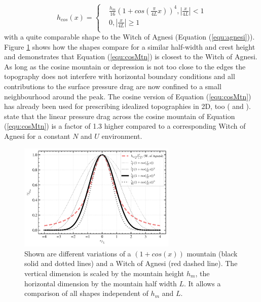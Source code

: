 \begin{equation}
    h_{cos}(x) = 
    \begin{cases}
        & \frac{h_m}{16} (1+cos(\frac{\pi}{4L}x))^4, |\frac{x}{4L}| < 1 \\
        & 0, |\frac{x}{4L}| \geq 1 \\
      \end{cases}
    \label{equ:cosMtn}
\end{equation}
with a quite comparable shape to the Witch of Agnesi (Equation (\ref{equ:agnesi})). Figure \ref{fig:topo_trans} shows how the shapes compare for a similar half-width and crest height and demonstrates that Equation (\ref{equ:cosMtn}) is closest to the Witch of Agnesi. As long as the cosine mountain or depression is not too close to the edges the topography does not interfere with horizontal boundary conditions and all contributions to the surface pressure drag are now confined to a small neighbourhood around the peak. The cosine version of Equation (\ref{equ:cosMtn}) has already been used for prescribing idealized topographies in 2D, too (\cite[]{epifanio_three-dimensional_2001} and \cite[]{metz_are_2021}). \textcite{metz_are_2021} state that the linear pressure drag across the cosine mountain of Equation (\ref{equ:cosMtn}) is a factor of 1.3 higher compared to a corresponding Witch of Agnesi for a constant $N$ and $U$ environment.
\begin{figure}[t]
    \centering
    \includegraphics[width=0.67\textwidth]{figures_model/topo-transient-boundary.png}
    \caption{Shown are different variations of a $(1+cos(x))$ mountain (black solid and dotted lines) and a Witch of Agnesi (red dashed line). The vertical dimension is scaled by the mountain height $h_m$, the horizontal dimension by the mountain half width $L$. It allows a comparison of all shapes independent of $h_m$ and $L$.}
    \label{fig:topo_trans}
\end{figure} 

